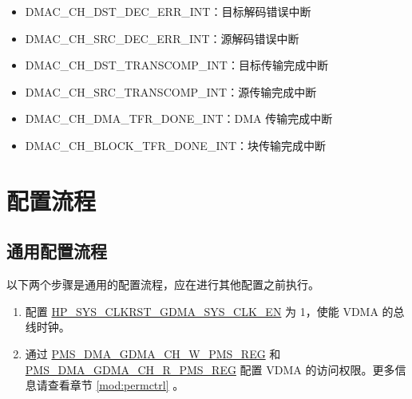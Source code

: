 \documentclass[main\_\_CN.tex]{subfiles}
\begin{document}
\begin{itemize}
\begin{itemize}
        \item \label{int:DMACCHNDSTDECERRINT}DMAC\_CH\_DST\_DEC\_ERR\_INT：目标解码错误中断
        \item \label{int:DMACCHNSRCDECERRINT}DMAC\_CH\_SRC\_DEC\_ERR\_INT：源解码错误中断
        \item \label{int:DMACCHNDSTTRANSCOMPINT}DMAC\_CH\_DST\_TRANSCOMP\_INT：目标传输完成中断
        \item \label{int:DMACCHNSRCTRANSCOMPINT}DMAC\_CH\_SRC\_TRANSCOMP\_INT：源传输完成中断
        \item \label{int:DMACCHNDMATFRDONEINT}DMAC\_CH\_DMA\_TFR\_DONE\_INT：DMA 传输完成中断
        \item \label{int:DMACCHNBLOCKTFRDONEINT}DMAC\_CH\_BLOCK\_TFR\_DONE\_INT：块传输完成中断
    \end{itemize}
\end{itemize}

\section{配置流程}
\label{sec:vdma-prog-procedures}

\subsection{通用配置流程}

以下两个步骤是通用的配置流程，应在进行其他配置之前执行。

\begin{enumerate}
    \item 配置 \hyperref[fielddesc:HPSYSCLKRSTGDMASYSCLKEN]{HP\_SYS\_CLKRST\_GDMA\_SYS\_CLK\_EN} 为 1，使能 VDMA 的总线时钟。
    \item 通过 \hyperref[regdesc:PMSDMAGDMACHNWPMSREG]{PMS\_DMA\_GDMA\_CH\_W\_PMS\_REG} 和 \hyperref[regdesc:PMSDMAGDMACHNRPMSREG]{PMS\_DMA\_GDMA\_CH\_R\_PMS\_REG} 配置 VDMA 的访问权限。更多信息请查看章节 \ref{mod:permctrl} \textit{}。
\end{enumerate}
\end{document}
